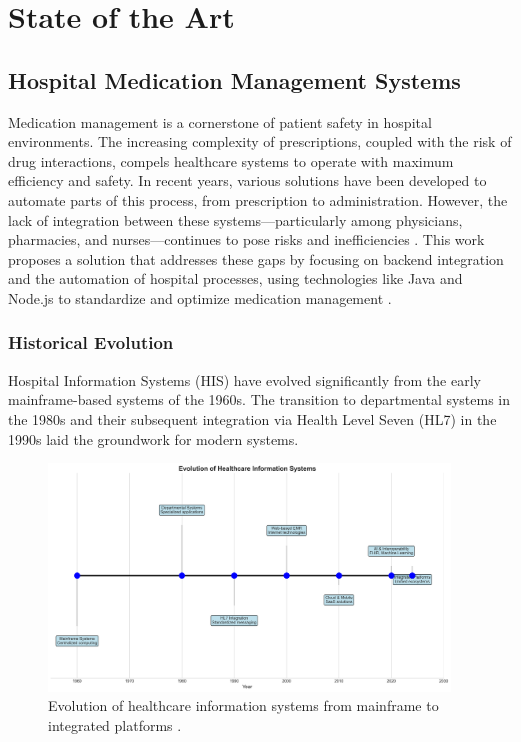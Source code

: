\chapter{State of the Art}

\section{Hospital Medication Management Systems}

Medication management is a cornerstone of patient safety in hospital environments. The increasing complexity of prescriptions, coupled with the risk of drug interactions, compels healthcare systems to operate with maximum efficiency and safety. In recent years, various solutions have been developed to automate parts of this process, from prescription to administration. However, the lack of integration between these systems—particularly among physicians, pharmacies, and nurses—continues to pose risks and inefficiencies \cite{bowles2020, kallio2020}. This work proposes a solution that addresses these gaps by focusing on backend integration and the automation of hospital processes, using technologies like Java and Node.js to standardize and optimize medication management \cite{Ghobadi2022}.

\subsection{Historical Evolution}

Hospital Information Systems (HIS) have evolved significantly from the early mainframe-based systems of the 1960s. The transition to departmental systems in the 1980s and their subsequent integration via Health Level Seven (HL7) \cite{dolin2006, mandl2020} in the 1990s laid the groundwork for modern systems.

\begin{figure}[htbp]
    \centering
    \includegraphics[width=0.95\textwidth]{images/generated/healthcare_it_timeline.png}
    \caption{Evolution of healthcare information systems from mainframe to integrated platforms \citep{shermock2023, vaghasiya2023}.}
    \label{fig:healthcare_it_timeline}
\end{figure}

